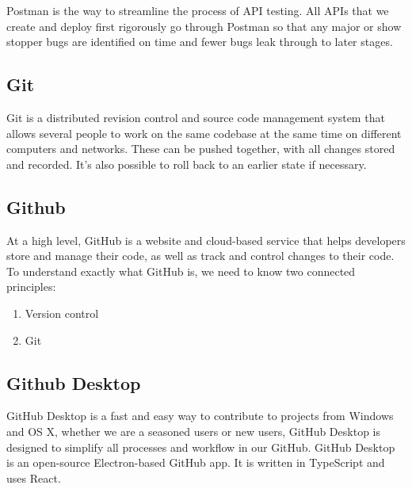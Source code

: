 Postman is the way to streamline the process of API testing. All APIs that we create and deploy first rigorously go through Postman so that any major or show stopper bugs are identified on time and fewer bugs leak through to later stages.



\subsection{Git}
Git is a distributed revision control and source code management system that
allows several people to work on the same codebase at the same time on different
computers and networks. These can be pushed together, with all changes stored and
recorded. It’s also possible to roll back to an earlier state if necessary.
\subsection{Github}
At a high level, GitHub is a website and cloud-based service that helps developers store and manage their code, as well as track and control changes to their code. To understand exactly what GitHub is, we need to know two connected principles:
\begin{enumerate}
      \item Version control
      \item Git
\end{enumerate}

\subsection{Github Desktop}
GitHub Desktop is a fast and easy way to contribute to projects from Windows and OS X, whether we are a seasoned users or new users, GitHub Desktop is designed to simplify all processes and workflow in our GitHub. GitHub Desktop is an open-source Electron-based GitHub app. It is written in TypeScript and uses React.


